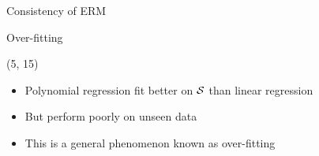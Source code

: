 \begin{frame}{Consistency of \acs{ERM}}


\end{frame}

\begin{frame}{Over-fitting}
  \note{
    \begin{itemize}
    \end{itemize}
  }

  \begin{textblock}{35}(5, 15)
    \begin{itemize}
    \item<3-> Polynomial regression fit better on $\mathcal{S}$ than linear regression
    \item<4-> But perform poorly on unseen data
    \item<4-> This is a general phenomenon known as over-fitting
    \end{itemize}
  \end{textblock}


\end{frame}
